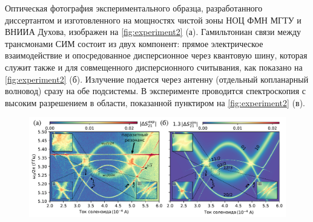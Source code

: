 \documentclass[14pt, a4paper]{extarticle}
\begin{document}
Оптическая фотография экспериментального образца, разработанного диссертантом и изготовленного на мощностях чистой зоны НОЦ ФМН МГТУ и ВНИИА Духова, изображен на \autoref{fig:experiment2} (а). Гамильтониан связи между трансмонами СИМ состоит из двух компонент: прямое электрическое взаимодействие и опосредованное дисперсионное через квантовую шину, которая служит также и для совмещенного дисперсионного считывания, как показано на \autoref{fig:experiment2} (б). Излучение подается через антенну (отдельный копланарный волновод) сразу на обе подсистемы. В эксперименте проводится спектроскопия с высоким разрешением в области, показанной пунктиром на \autoref{fig:experiment2} (в).


\begin{figure}
	
	\centering
	\includegraphics[width=\linewidth]{main_picture}
	

\end{figure}
\end{document}

